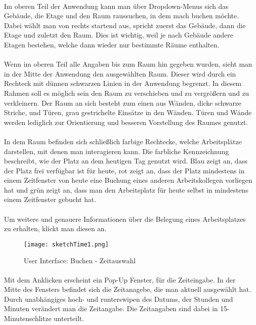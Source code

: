 \paragraph{}Im oberen Teil der Anwendung kann man über Dropdown-Menus sich das Gebäude, die Etage und den Raum raussuchen, in dem mach buchen möchte.
Dabei wählt man von rechts startend aus, spricht zuerst das Gebäude, dann die Etage und zuletzt den Raum.
Dies ist wichtig, weil je nach Gebäude andere Etagen bestehen, welche dann wieder nur bestimmte Räume enthalten.

\paragraph{}Wenn im oberen Teil alle Angaben bis zum Raum hin gegeben wurden, sieht man in der Mitte der Anwendung den ausgewählten Raum.
Dieser wird durch ein Rechteck mit dünnen  schwarzen Linien in der Anwendung begrenzt.
In diesem Rahmen soll es möglich sein den Raum zu verschieben und zu vergrößern und zu verkleinern.
Der Raum an sich besteht zum einen aus Wänden, dicke schwarze Striche, und Türen, grau gestrichelte Einsätze in den Wänden. Türen und Wände werden 
lediglich zur Orientierung und besseren Vorstellung des Raumes genutzt. 
\paragraph{}In dem Raum befinden sich schließlich farbige Rechtecke, welche Arbeitsplätze darstellen, mit denen man interagieren kann. Die farbliche Kennzeichnung beschreibt, wie der Platz an dem heutigen Tag genutzt wird.
Blau zeigt an, dass der Platz frei verfügbar ist für heute, rot zeigt an, dass der Platz mindestens in einem Zeitfenster von heute eine Buchung eines anderen Arbeitskollegen vorliegen hat und grün zeigt an, dass man den Arbeitsplatz für heute selbst in mindestens einem Zeitfenster gebucht hat.
\paragraph{}Um weitere und genauere Informationen über die Belegung eines Arbeitsplatzes zu erhalten, klickt man diesen an.

\begin{wrapfigure}{r}{5.5cm}
  \texttt{[image: sketchTime1.png]}
  \caption{User Interface: Buchen - Zeitauswahl}
\end{wrapfigure}

\paragraph{}Mit dem Anklicken erscheint ein Pop-Up Fenster, für die Zeiteingabe. 
In der Mitte des Fensters befindet sich die Zeitanagebe, die man aktuell ausgewählt hat. 
Durch unabhängiges hoch- und runterswipen des Datums, der Stunden und Minuten verändert man die Zeitangabe.
Die Zeitangaben sind dabei in 15-Minutenschlitze unterteilt.

